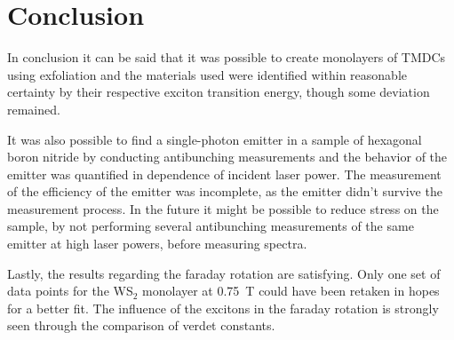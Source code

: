\newpage
\section{Conclusion}


  In conclusion it can be said that it was possible to create monolayers of TMDCs using exfoliation and the materials used were identified within reasonable certainty by their respective exciton transition energy, though some deviation remained.

  It was also possible to find a single-photon emitter in a sample of hexagonal boron nitride by conducting antibunching measurements and the behavior of the emitter was quantified in dependence of incident laser power.
  The measurement of the efficiency of the emitter was incomplete, as the emitter didn't survive the measurement process.
  In the future it might be possible to reduce stress on the sample, by not performing several antibunching measurements of the same emitter at high laser powers, before measuring spectra.

  Lastly, the results regarding the faraday rotation are satisfying. Only one set of data points for the WS$_2$ monolayer at \SI{0.75}{\tesla} could have been retaken in hopes for a better fit.
  The influence of the excitons in the faraday rotation is strongly seen through the comparison of verdet constants.

